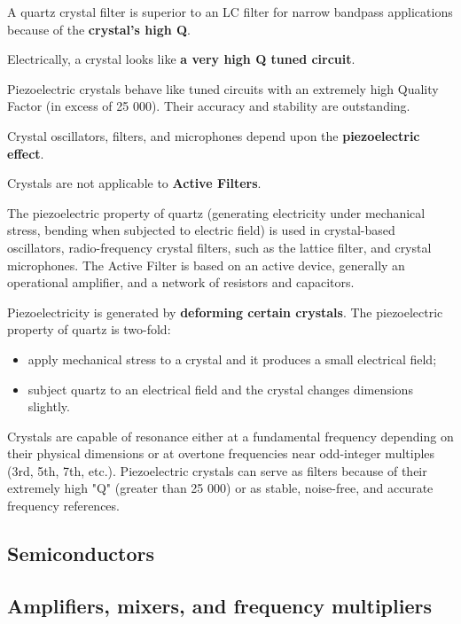 \documentclass[letterpaper]{article}
\begin{document}
        A quartz crystal filter is superior to an LC filter for narrow bandpass applications because of the \textbf{crystal's high Q}.

        Electrically, a crystal looks like \textbf{a very high Q tuned circuit}.

        Piezoelectric crystals behave like tuned circuits with an extremely high Quality Factor (in excess of 25 000).  Their accuracy and stability are outstanding.

        Crystal oscillators, filters, and microphones depend upon the \textbf{piezoelectric effect}.

        Crystals are not applicable to \textbf{Active Filters}.

        The piezoelectric property of quartz (generating electricity under mechanical stress, bending when subjected to electric field) is used in crystal-based oscillators, radio-frequency crystal filters, such as the lattice filter, and crystal microphones.
        The Active Filter is based on an active device, generally an operational amplifier, and a network of resistors and capacitors.

        Piezoelectricity is generated by \textbf{deforming certain crystals}.
        The piezoelectric property of quartz is two-fold:
        \begin{itemize}
            \item apply mechanical stress to a crystal and it produces a small electrical field;
            \item subject quartz to an electrical field and the crystal changes dimensions slightly.
        \end{itemize}
        Crystals are capable of resonance either at a fundamental frequency depending on their physical dimensions or at overtone frequencies near odd-integer multiples (3rd, 5th, 7th, etc.).
        Piezoelectric crystals can serve as filters because of their extremely high "Q" (greater than 25 000) or as stable, noise-free, and accurate frequency references.

        \newpage

        \subsection{Semiconductors}

        \newpage

        \subsection{Amplifiers, mixers, and frequency multipliers}
\end{document}

